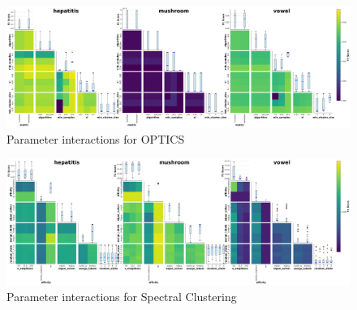\begin{figure}[!htbp]
    \includegraphics[width=\textwidth]{figures/interactions_optics.png}
    \caption{Parameter interactions for OPTICS}
    \label{fig:interactions_optics_full}
\end{figure}


\FloatBarrier

\begin{figure}[!htbp]
    \includegraphics[width=\textwidth]{figures/interactions_spectral_clustering.png}
    \caption{Parameter interactions for Spectral Clustering}
    \label{fig:interactions_spectral_clustering_full}
\end{figure}


